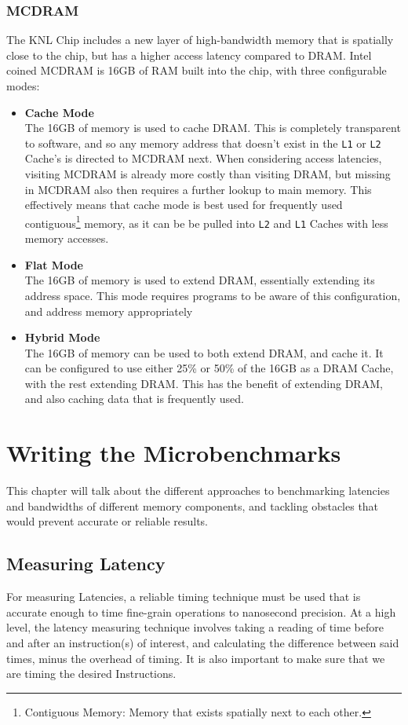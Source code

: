 \documentclass[bsc,frontabs,twoside,singlespacing,parskip,deptreport]{infthesis}     %
\begin{document}
\subsection{MCDRAM}
The KNL Chip includes a new layer of high-bandwidth memory that is spatially close to the chip, but has a higher access latency compared to DRAM. Intel coined MCDRAM is 16GB of RAM built into the chip, with three configurable modes:

\begin{itemize}
    \item \textbf{Cache Mode} \\
    The 16GB of memory is used to cache DRAM. This is completely transparent to software, and so any memory address that doesn't exist in the \texttt{L1} or \texttt{L2} Cache's is directed to MCDRAM next. When considering access latencies, visiting MCDRAM is already more costly than visiting DRAM, but missing in MCDRAM also then requires a further lookup to main memory. This effectively means that cache mode is best used for frequently used contiguous\footnote{Contiguous Memory: Memory that exists spatially next to each other.} memory, as it can be be pulled into \texttt{L2} and \texttt{L1} Caches with less memory accesses.
    
    \item \textbf{Flat Mode} \\
    The 16GB of memory is used to extend DRAM, essentially extending its address space. This mode requires programs to be aware of this configuration, and address memory appropriately
    
    \item \textbf{Hybrid Mode} \\
    The 16GB of memory can be used to both extend DRAM, and cache it. It can be configured to use either 25\% or 50\% of the 16GB as a DRAM Cache, with the rest extending DRAM. This has the benefit of extending DRAM, and also caching data that is frequently used.
\end{itemize}

\chapter{Writing the Microbenchmarks}
This chapter will talk about the different approaches to benchmarking latencies and bandwidths of different memory components, and tackling obstacles that would prevent accurate or reliable results.

\section{Measuring Latency}\label{measuring-latency}
For measuring Latencies, a reliable timing technique must be used that is accurate enough to time fine-grain operations to nanosecond precision. At a high level, the latency measuring technique involves taking a reading of time before and after an instruction(s) of interest, and calculating the difference between said times, minus the overhead of timing. It is also important to make sure that we are timing the desired Instructions.
\end{document}

